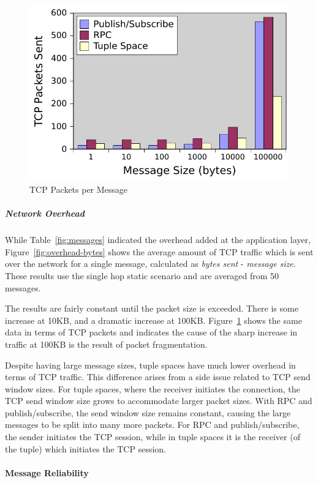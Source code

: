 \begin{figure}
\centering
\includegraphics{figures/message-overhead-packets.pdf}
\caption{TCP Packets per Message}
\label{fig:overhead-packets}
\end{figure}

\subparagraph{Network Overhead}

While Table~\ref{fig:messages} indicated the overhead added at the application layer, Figure~\ref{fig:overhead-bytes} shows the average amount of TCP traffic which is sent over the network for a single message, calculated as \textit{bytes sent} - \textit{message size}. These results use the single hop static scenario and are averaged from 50 messages.

The results are fairly constant until the packet size is exceeded. There is some increase at 10KB, and a dramatic increase at 100KB. Figure~\ref{fig:overhead-packets} shows the same data in terms of TCP packets and indicates the cause of the sharp increase in traffic at 100KB is the result of packet fragmentation.

Despite having large message sizes, tuple spaces have much lower overhead in terms of TCP traffic. This difference arises from a side issue related to TCP send window sizes. For tuple spaces, where the receiver initiates the connection, the TCP send window size grows to accommodate larger packet sizes. With RPC and publish/subscribe, the send window size remains constant, causing the large messages to be split into many more packets. For RPC and publish/subscribe, the sender initiates the TCP session, while in tuple spaces it is the receiver (of the tuple) which initiates the TCP session.

\paragraph{Message Reliability}

